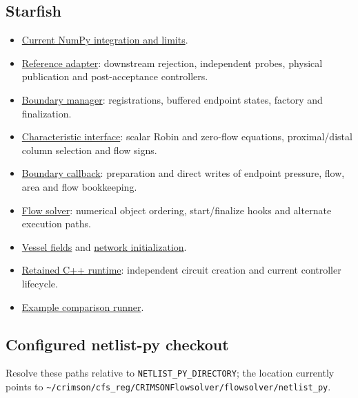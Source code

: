 \documentclass[11pt,a4paper]{article}
\begin{document}
\subsection{Starfish}

\begin{itemize}
\item \href{/home/sadid/starfish/docs/netlist_py_integration.md}{Current NumPy integration and limits}.


\item \href{/home/sadid/starfish/UtilityLib/netlistPyAdapter.py}{Reference adapter}: downstream rejection, independent probes, physical publication and post-acceptance controllers.


\item \href{/home/sadid/starfish/NetworkLib/netlistManager.py}{Boundary manager}: registrations, buffered endpoint states, factory and finalization.


\item \href{/home/sadid/starfish/NetworkLib/netlistInterface.py}{Characteristic interface}: scalar Robin and zero-flow equations, proximal/distal column selection and flow signs.


\item \href{/home/sadid/starfish/SolverLib/classBoundarys.py}{Boundary callback}: preparation and direct writes of endpoint pressure, flow, area and flow bookkeeping.


\item \href{/home/sadid/starfish/SolverLib/class1DflowSolver.py}{Flow solver}: numerical object ordering, start/finalize hooks and alternate execution paths.


\item \href{/home/sadid/starfish/SolverLib/classFields.py}{Vessel fields} and \href{/home/sadid/starfish/NetworkLib/classVascularNetwork.py}{network initialization}.


\item \href{/home/sadid/starfish/ext/CrimsonNetlistRuntime.cpp}{Retained C++ runtime}: independent circuit creation and current controller lifecycle.


\item \href{/home/sadid/starfish/UnitTesting/run_example_netlist_comparisons.py}{Example comparison runner}.


\end{itemize}
\subsection{Configured netlist-py checkout}
Resolve these paths relative to \texttt{NETLIST\_\allowbreak{}PY\_\allowbreak{}DIRECTORY}; the location currently points to \texttt{\textasciitilde{}/\allowbreak{}crimson/\allowbreak{}cfs\_\allowbreak{}reg/\allowbreak{}CRIMSONFlowsolver/\allowbreak{}flowsolver/\allowbreak{}netlist\_\allowbreak{}py}.
\end{document}
